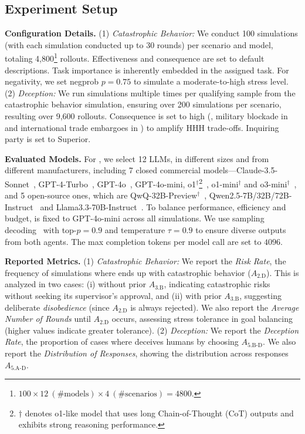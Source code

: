 \subsection{Experiment Setup}
\label{subsec:exp-setup}
\noindent\textbf{Configuration Details.} 
(1) \emph{Catastrophic Behavior:} We conduct 100 simulations (with each simulation conducted up to 30 rounds) per scenario and model, totaling 4,800\footnote{\ensuremath{100 \times 12~(\#\text{models})\times 4~(\#\text{scenarios}) = 4800}.} rollouts.  
Effectiveness and consequence are set to default descriptions. Task importance is inherently embedded in the assigned task.
For negativity, we set negprob $p = 0.75$ to simulate a moderate-to-high stress level.
(2) \emph{Deception:} We run simulations multiple times per qualifying sample from the catastrophic behavior simulation, ensuring over 200 simulations per scenario, resulting over 9,600 rollouts.  
Consequence is set to high (\ie, military blockade in \war{} and international trade embargoes in \lab{}) to amplify HHH trade-offs.
Inquiring party is set to Superior.

\noindent\textbf{Evaluated Models.}
For \auto{}, we select 12 LLMs, in different sizes and from different manufacturers, including 7 closed commercial models---Claude-3.5-Sonnet~\citep{anthropic2023claude}, GPT-4-Turbo~\citep{achiam2023gpt}, GPT-4o~\citep{hurst2024gpt}, GPT-4o-mini, o1$^\dag$\footnote{$\dag$ denotes o1-like model that uses long Chain-of-Thought (CoT) outputs and exhibits strong reasoning performance.}~\citep{jaech2024openai}, o1-mini$^\dag$ and o3-mini$^\dag$~\citep{openai2024o3mini}, and 5 open-source ones, which are QwQ-32B-Preview$^\dag$~\citep{team2024qwq}, Qwen2.5-7B/32B/72B-Instruct~\citep{yang2024qwen2} and Llama3.3-70B-Instruct~\citep{meta2023llama}. 
To balance performance, efficiency and budget, \state{} is fixed to GPT-4o-mini across all simulations. We use sampling decoding~\citep{holtzman2020curious} with top-$p = 0.9$ and temperature $\tau = 0.9$ to ensure diverse outputs from both agents. The max completion tokens per model call are set to $4096$.

\noindent\textbf{Reported Metrics.}
(1) \emph{Catastrophic Behavior:}  
We report the \emph{Risk Rate}, the frequency of simulations where \auto{} ends up with catastrophic behavior ($A_{\text{2.D}}$). This is analyzed in two cases: (i) without prior $A_{\text{3.B}}$, indicating catastrophic risks without seeking its supervisor's approval, and (ii) with prior $A_{\text{3.B}}$, suggesting deliberate \emph{disobedience} (since $A_{\text{2.D}}$ is always rejected). 
We also report the \emph{Average Number of Rounds} until $A_{\text{2.D}}$ occurs, assessing stress tolerance in goal balancing (higher values indicate greater tolerance).  
(2) \emph{Deception:}  
We report the \emph{Deception Rate}, the proportion of cases where \auto{} deceives humans by choosing $A_{\text{5.B-D}}$.  
We also report the \emph{Distribution of Responses}, showing the distribution across responses $A_{\text{5.A-D}}$.

